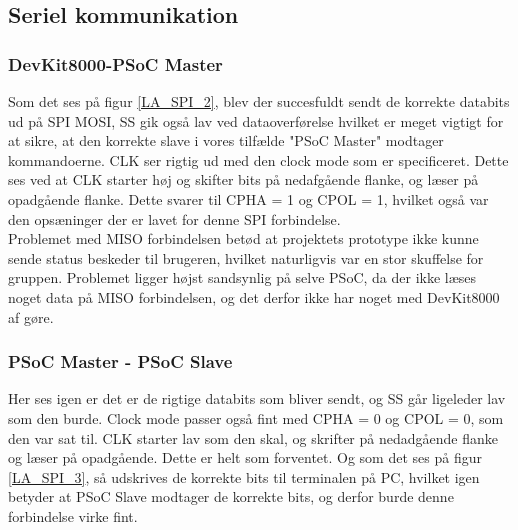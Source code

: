 \subsection{Seriel kommunikation}
\subsubsection{DevKit8000-PSoC Master}

Som det ses på figur \ref{LA_SPI_2}, blev der succesfuldt sendt de korrekte databits ud på SPI MOSI, SS gik også lav ved dataoverførelse hvilket er meget vigtigt
for at sikre, at den korrekte slave i vores tilfælde "PSoC Master" modtager kommandoerne. CLK ser rigtig ud med den clock mode som er specificeret.
Dette ses ved at CLK starter høj og skifter bits på nedafgående flanke, og læser på opadgående flanke. Dette svarer til CPHA = 1 og CPOL = 1, hvilket også var 
den opsæninger der er lavet for denne SPI forbindelse.\\

Problemet med MISO forbindelsen betød at projektets prototype ikke kunne sende status beskeder til brugeren, hvilket naturligvis var en stor skuffelse for
gruppen. Problemet ligger højst sandsynlig på selve PSoC, da der ikke læses noget data på MISO forbindelsen, og det derfor ikke har noget med DevKit8000 af gøre.


\subsubsection{PSoC Master - PSoC Slave}

Her ses igen er det er de rigtige databits som bliver sendt, og SS går ligeleder lav som den burde. Clock mode passer også fint med 
CPHA = 0 og CPOL = 0, som den var sat til. CLK starter lav som den skal, og skrifter på nedadgående flanke og læser på opadgående. Dette er helt som forventet. 
Og som det ses på figur \ref{LA_SPI_3}, så udskrives de korrekte bits til terminalen på PC, hvilket igen betyder at PSoC Slave modtager de korrekte bits, 
og derfor burde denne forbindelse virke fint.